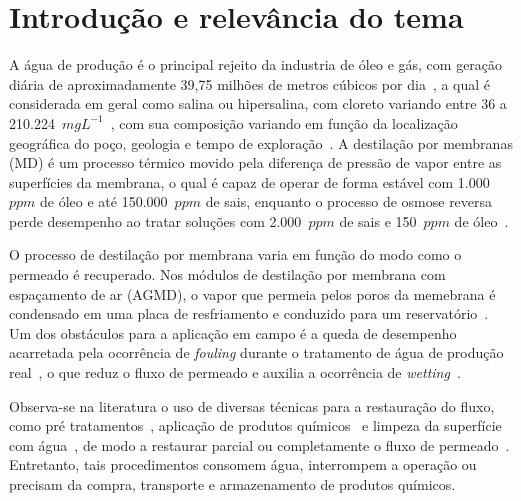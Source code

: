 \documentclass[a4paper,12pt]{article}
\begin{document}
\section{Introdução e relevância do tema}

A água de produção é o principal rejeito da industria de óleo e gás, com geração diária de aproximadamente 39,75 milhões de metros cúbicos por dia~\cite{Ibrahim2023ProducedWater,Harkouss2024MembraneBased}, a qual é considerada em geral como salina ou hipersalina, com cloreto variando entre 36 a 210.224~$mgL^{-1}$~\cite{Alley2011ProducedWater}, com sua composição variando em função da localização geográfica do poço, geologia e tempo de exploração~\cite{OzgunProducedWater}. A destilação por membranas (MD) é um processo térmico movido pela diferença de pressão de vapor entre as superfícies da membrana, o qual é capaz de operar de forma estável com 1.000~$ppm$ de óleo e até 150.000~$ppm$ de sais, enquanto o processo de osmose reversa perde desempenho ao tratar soluções com 2.000~$ppm$ de sais e 150~$ppm$ de óleo~\cite{Mansi2023ProducedWater}.

O processo de destilação por membrana varia em função do modo como o permeado é recuperado. Nos módulos de destilação por membrana com espaçamento de ar (AGMD), o vapor que permeia pelos poros da memebrana é condensado em uma placa de resfriamento e conduzido para um reservatório~\cite{Olatunji2018HeatMassTransport}. Um dos obstáculos para a aplicação em campo é a queda de desempenho acarretada pela ocorrência de \textit{fouling} durante o tratamento de água de produção real~\cite{Mansi2023ProducedWater}, o que reduz o fluxo de permeado e auxilia a ocorrência de \textit{wetting}~\cite{Warsinger2017ReversingWetting,Mansi2023ProducedWater}. 

Observa-se na literatura o uso de diversas técnicas para a restauração do fluxo, como pré tratamentos~\cite{Zhang2019ProducedWater,Alkhatib2021FoulingMitigation}, aplicação de produtos químicos~\cite{Duong2016MembraneScaling,Amin2023BiofilmCleaning} e limpeza da superfície com água~\cite{Lee2025MembraneVibration,Tomczak2022OperationalParameters}, de modo a restaurar parcial ou completamente o fluxo de permeado~\cite{Duong2016MembraneScaling,Zhang2019ProducedWater,Lee2025MembraneVibration,Amin2023BiofilmCleaning}. Entretanto, tais procedimentos consomem água, interrompem a operação ou precisam da compra, transporte e armazenamento de produtos químicos.
\end{document}
